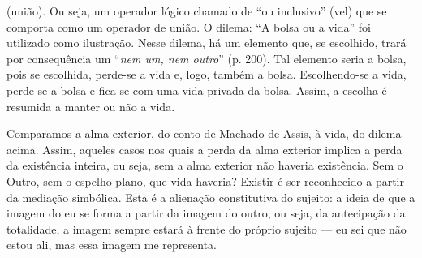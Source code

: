 \begin{multicols}{2}
(\allowbreak{}união)\allowbreak{}.\allowbreak{} Ou seja,\allowbreak{} um operador lógico chamado de “ou inclusivo” (\allowbreak{}vel)\allowbreak{} que se comporta como um operador de união.\allowbreak{} O dilema:\allowbreak{} “A bolsa ou a vida” foi utilizado como ilustração.\allowbreak{} Nesse dilema,\allowbreak{} há um elemento que,\allowbreak{} se escolhido,\allowbreak{} trará por consequência um “\textit{nem um,\allowbreak{} nem outro}” (\allowbreak{}p.\allowbreak{} 200)\allowbreak{}.\allowbreak{} Tal elemento seria a bolsa,\allowbreak{} pois se escolhida,\allowbreak{} perde-\allowbreak{}se a vida e,\allowbreak{} logo,\allowbreak{} também a bolsa.\allowbreak{} Escolhendo-\allowbreak{}se a vida,\allowbreak{} perde-\allowbreak{}se a bolsa e fica-\allowbreak{}se com uma vida privada da bolsa.\allowbreak{} Assim,\allowbreak{} a escolha é resumida a manter ou não a vida.\allowbreak{}\par{}Comparamos a alma exterior,\allowbreak{} do conto de Machado de Assis,\allowbreak{} à vida,\allowbreak{} do dilema acima.\allowbreak{} Assim,\allowbreak{} aqueles casos nos quais a perda da alma exterior implica a perda da existência inteira,\allowbreak{} ou seja,\allowbreak{} sem a alma exterior não haveria existência.\allowbreak{} Sem o Outro,\allowbreak{} sem o espelho plano,\allowbreak{} que vida haveria? Existir é ser reconhecido a partir da mediação simbólica.\allowbreak{} Esta é a alienação constitutiva do sujeito:\allowbreak{} a ideia de que a imagem do eu se forma a partir da imagem do outro,\allowbreak{} ou seja,\allowbreak{} da antecipação da totalidade,\allowbreak{} a imagem sempre estará à frente do próprio sujeito — eu sei que não estou ali,\allowbreak{} mas essa imagem me representa.\allowbreak{}

\end{multicols}
